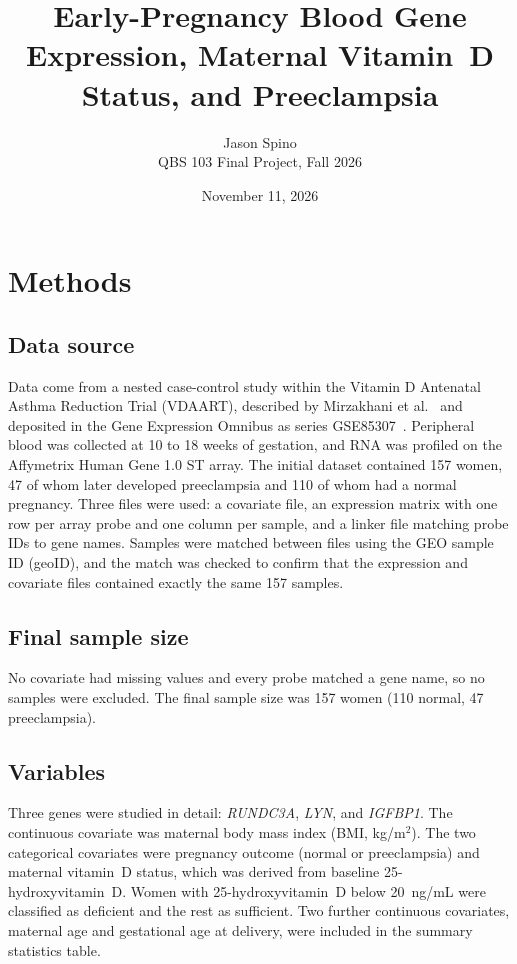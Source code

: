 \documentclass[11pt]{article}
\title{Early-Pregnancy Blood Gene Expression, Maternal Vitamin~D Status, and Preeclampsia}
\author{Jason Spino\\[2pt] \small QBS 103 Final Project, Fall 2026}
\date{November 11, 2026}
\begin{document}
\maketitle

\section{Methods}

\subsection{Data source}
Data come from a nested case-control study within the Vitamin D Antenatal
Asthma Reduction Trial (VDAART), described by Mirzakhani et
al.~\cite{mirzakhani2016} and deposited in the Gene Expression Omnibus as
series GSE85307~\cite{geo_gse85307}. Peripheral blood was collected at 10 to
18 weeks of gestation, and RNA was profiled on the Affymetrix Human Gene 1.0 ST
array. The initial dataset contained 157 women, 47 of whom later developed
preeclampsia and 110 of whom had a normal pregnancy. Three files were used: a
covariate file, an expression matrix with one row per array probe and one
column per sample, and a linker file matching probe IDs to gene names. Samples
were matched between files using the GEO sample ID (geoID), and the match was
checked to confirm that the expression and covariate files contained exactly
the same 157 samples.

\subsection{Final sample size}
No covariate had missing values and every probe matched a gene name, so no
samples were excluded. The final sample size was 157 women (110 normal, 47
preeclampsia).

\subsection{Variables}
Three genes were studied in detail: \textit{RUNDC3A}, \textit{LYN}, and
\textit{IGFBP1}. The continuous covariate was maternal body mass index (BMI,
kg/m$^2$). The two categorical covariates were pregnancy outcome (normal or
preeclampsia) and maternal vitamin~D status, which was derived from baseline
25-hydroxyvitamin~D. Women with 25-hydroxyvitamin~D below 20~ng/mL were
classified as deficient and the rest as sufficient. Two further continuous
covariates, maternal age and gestational age at delivery, were included in the
summary statistics table.
\end{document}
